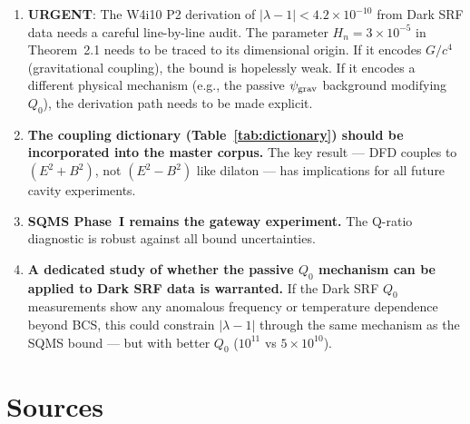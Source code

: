 \documentclass[11pt]{article}
\newcommand{\lbone}{|\lambda - 1|}
\newcommand{\ee}[1]{\times 10^{#1}}
\theoremstyle{definition}
\theoremstyle{remark}
\begin{document}
\begin{enumerate}
\item \textbf{URGENT}: The W4i10 P2 derivation of $\lbone < 4.2\ee{-10}$
  from Dark SRF data needs a careful line-by-line audit. The parameter
  $H_n = 3\ee{-5}$ in Theorem~2.1 needs to be traced to its dimensional
  origin. If it encodes $G/c^4$ (gravitational coupling), the bound is
  hopelessly weak. If it encodes a different physical mechanism (e.g.,
  the passive $\psi_{\rm grav}$ background modifying $Q_0$), the
  derivation path needs to be made explicit.

\item \textbf{The coupling dictionary (Table~\ref{tab:dictionary}) should
  be incorporated into the master corpus.} The key result --- DFD couples
  to $(E^2 + B^2)$, not $(E^2 - B^2)$ like dilaton --- has implications
  for all future cavity experiments.

\item \textbf{SQMS Phase~I remains the gateway experiment.} The Q-ratio
  diagnostic is robust against all bound uncertainties.

\item \textbf{A dedicated study of whether the passive $Q_0$ mechanism
  can be applied to Dark SRF data is warranted.} If the Dark SRF $Q_0$
  measurements show any anomalous frequency or temperature dependence
  beyond BCS, this could constrain $\lbone$ through the same mechanism
  as the SQMS bound --- but with better $Q_0$ ($10^{11}$ vs $5\ee{10}$).
\end{enumerate}


\section{Sources}
\label{sec:sources}
\end{document}
